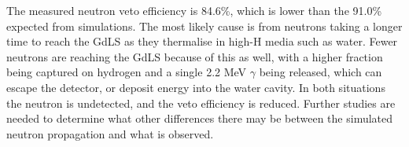 



\par
The measured neutron veto efficiency is 84.6\%, which is lower than the 91.0\% expected from simulations.
The most likely cause is from neutrons taking a longer time to reach the GdLS as they thermalise in high-H media such as water.
Fewer neutrons are reaching the GdLS because of this as well, with a higher fraction being captured on hydrogen and a single 2.2 MeV $\gamma$ being released, which can escape the detector, or deposit energy into the water cavity.
In both situations the neutron is undetected, and the veto efficiency is reduced.
Further studies are needed to determine what other differences there may be between the simulated neutron propagation and what is observed.

